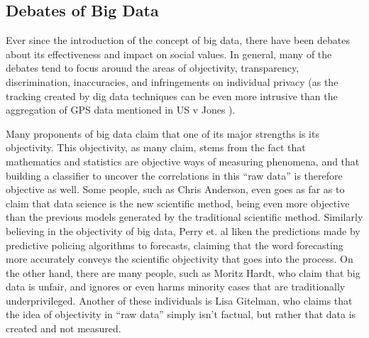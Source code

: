 \documentclass[12pt]{article} %
\begin{document}
\subsection{Debates of Big Data}
Ever since the introduction of the concept of big data, there have been debates about its effectiveness and impact on social values. In general, many of the debates tend to focus around the areas of objectivity, transparency, discrimination, inaccuracies, and infringements on individual privacy (as the tracking created by dig data techniques can be even more intrusive than the aggregation of GPS data mentioned in US v Jones \cite{2012us}).

Many proponents of big data claim that one of its major strengths is its objectivity. This objectivity, as many claim, stems from the fact that mathematics and statistics are objective ways of measuring phenomena, and that building a classifier to uncover the correlations in this ``raw data'' is therefore objective as well. Some people, such as Chris Anderson, even goes as far as to claim that data science is the new scientific method, being even more objective than the previous models generated by the traditional scientific method. \cite{anderson_2008} Similarly believing in the objectivity of big data, Perry et. al liken the predictions made by predictive policing algorithms to forecasts, claiming that the word forecasting more accurately conveys the scientific objectivity that goes into the process. \cite{perryetal} On the other hand, there are many people, such as Moritz Hardt, who claim that big data is unfair, and ignores or even harms minority cases that are traditionally underprivileged. \cite{hardt} Another of these individuals is Lisa Gitelman, who claims that the idea of objectivity in ``raw data'' simply isn't factual, but rather that data is created and not measured. \cite{gitelman2013raw}
\end{document}
